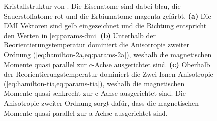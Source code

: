 \documentclass[main.tex]{subfiles}
\begin{document}
\begin{figure}[htbp]
	\centering
	\caption{Kristallstruktur von .  Die Eisenatome sind dabei blau, die Sauerstoffatome rot und die Erbiumatome magenta gefärbt. 
	\textbf{(a)} Die DMI Vektoren sind gelb eingezeichnet und die Richtung entspricht den Werten in \cref{eq:params-dmi} 
	\textbf{(b)} Unterhalb der Reorientierungstemperatur dominiert die Anisotropie zweiter Ordnung (\cref{eq:hamilton-2a,eq:params-2a}), weshalb die magnetischen Momente quasi parallel zur c-Achse ausgerichtet sind. 
	\textbf{(c)} Oberhalb der Reorientierungstemperatur dominiert die Zwei-Ionen Anisotropie (\cref{eq:hamilton-tia,eq:params-tia}), weshalb die magnetischen Momente quasi senkrecht zur c-Achse ausgerichtet sind. Die Anisotropie zweiter Ordnung sorgt dafür, dass die magnetischen Momente quasi parallel zur a-Achse ausgerichtet sind.~\cite{schlegel-master}}
	\label{fig:orthoferrit}
\end{figure}
\end{document}

